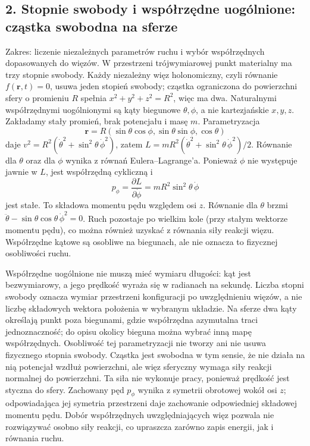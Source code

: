 \documentclass[11pt,a4paper]{article}
\begin{document}
\subsection{2. Stopnie swobody i współrzędne uogólnione: cząstka swobodna na sferze}
Zakres: liczenie niezależnych parametrów ruchu i wybór współrzędnych dopasowanych do więzów. W przestrzeni trójwymiarowej punkt materialny ma trzy stopnie swobody. Każdy niezależny więz holonomiczny, czyli równanie \(f(\mathbf r,t)=0\), usuwa jeden stopień swobody; cząstka ograniczona do powierzchni sfery o promieniu \(R\) spełnia \(x^2+y^2+z^2=R^2\), więc ma dwa. Naturalnymi współrzędnymi uogólnionymi są kąty biegunowe \(\theta,\phi\), a nie kartezjańskie \(x,y,z\). Zakładamy stały promień, brak potencjału i masę \(m\). Parametryzacja
\[
\mathbf r=R(\sin\theta\cos\phi,\sin\theta\sin\phi,\cos\theta)
\]
daje \(v^2=R^2(\dot\theta^2+\sin^2\theta\,\dot\phi^2)\), zatem \(L=mR^2(\dot\theta^2+\sin^2\theta\,\dot\phi^2)/2\). Równanie dla \(\theta\) oraz dla \(\phi\) wynika z równań Eulera--Lagrange’a. Ponieważ \(\phi\) nie występuje jawnie w \(L\), jest współrzędną cykliczną i
\[
p_\phi=\frac{\partial L}{\partial\dot\phi}=mR^2\sin^2\theta\,\dot\phi
\]
jest stałe. To składowa momentu pędu względem osi \(z\). Równanie dla \(\theta\) brzmi \(\ddot\theta-\sin\theta\cos\theta\,\dot\phi^2=0\). Ruch pozostaje po wielkim kole (przy stałym wektorze momentu pędu), co można również uzyskać z równania siły reakcji więzu. Współrzędne kątowe są osobliwe na biegunach, ale nie oznacza to fizycznej osobliwości ruchu.

Współrzędne uogólnione nie muszą mieć wymiaru długości: kąt jest bezwymiarowy, a jego prędkość wyraża się w radianach na sekundę. Liczba stopni swobody oznacza wymiar przestrzeni konfiguracji po uwzględnieniu więzów, a nie liczbę składowych wektora położenia w wybranym układzie. Na sferze dwa kąty określają punkt poza biegunami, gdzie współrzędna azymutalna traci jednoznaczność; do opisu okolicy bieguna można wybrać inną mapę współrzędnych. Osobliwość tej parametryzacji nie tworzy ani nie usuwa fizycznego stopnia swobody. Cząstka jest swobodna w tym sensie, że nie działa na nią potencjał wzdłuż powierzchni, ale więz sferyczny wymaga siły reakcji normalnej do powierzchni. Ta siła nie wykonuje pracy, ponieważ prędkość jest styczna do sfery. Zachowany pęd \(p_\phi\) wynika z symetrii obrotowej wokół osi \(z\); odpowiadająca jej symetria przestrzeni daje zachowanie odpowiedniej składowej momentu pędu. Dobór współrzędnych uwzględniających więz pozwala nie rozwiązywać osobno siły reakcji, co upraszcza zarówno zapis energii, jak i równania ruchu.
\end{document}
